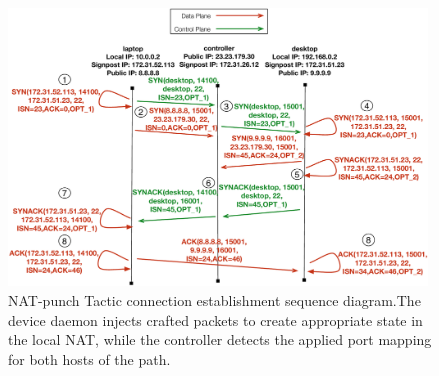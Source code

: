 \begin{itemize}
\begin{figure}
  \begin{center}
	\includegraphics[width=0.99\textwidth]{Chapter3/Chapter3Figs/nat-punch-example}
  \end{center}
  \caption[NAT-punch Tactic connection establishment sequence
  diagram.]{NAT-punch Tactic connection establishment sequence diagram.The
    device \signpost daemon injects crafted packets to create appropriate state
    in the local NAT, while the controller detects the applied port mapping for
    both hosts of the \signpost path.}
  \label{fig:signpost:nat-panch-example}
\end{figure}
  

\end{itemize}
